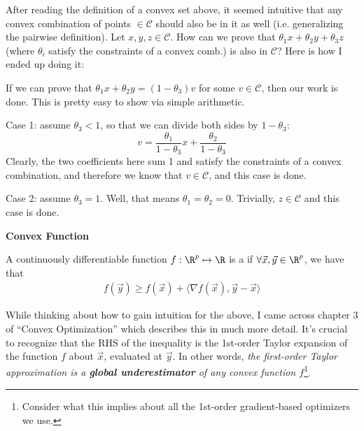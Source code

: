 \documentclass[11pt]{article}
\begin{document}
\begin{example}
	After reading the definition of a convex set above, it seemed intuitive that any convex combination of points $\in \mathcal C$ should also be in it as well (i.e. generalizing the pairwise definition). Let $x, y, z \in \mathcal C$. How can we prove that $\theta_1 x + \theta_2 y + \theta_3 z$ (where $\theta_i$ satisfy the constraints of a convex comb.) is also in $\mathcal C$? Here is how I ended up doing it:
	
	\begin{compactitem}
		\item If we can prove that $\theta_1 x + \theta_2 y = (1 - \theta_3) v$ for some $v \in \mathcal{C}$, then our work is done. This is pretty easy to show via simple arithmetic. 
		\item Case 1: assume $\theta_3 < 1$, so that we can divide both sides by $1 - \theta_3$:
		$$
		v = \frac{\theta_1}{1 - \theta_3} x	+ \frac{\theta_2}{1 - \theta_3}
		$$
		Clearly, the two coefficients here sum 1 and satisfy the constraints of a convex combination, and therefore we know that $v \in \mathcal C$, and this case is done. 
		
		\item Case 2: assume $\theta_3 = 1$. Well, that means $\theta_1 = \theta_2 = 0$. Trivially, $z \in \mathcal C$ and this case is done. 
	\end{compactitem}
\end{example}

\textbf{Convex Function}
\begin{definition}[-1em]
	A continuously differentiable function $f : \R^p \mapsto \R$ is a  if $\forall \vec x, \vec y \in \R^p$, we have that
	\begin{align}
	f(\vec y) \ge f(\vec x) + \langle \nabla f(\vec x), \vec y - \vec x \rangle 
	\end{align}
\end{definition}
While thinking about how to gain intuition for the above, I came across chapter 3 of ``Convex Optimization'' which describes this in much more detail. It's crucial to recognize that the RHS of the inequality is the 1st-order Taylor expansion of the function $f$ about $\vec x$, evaluated at $\vec y$. In other words, \textit{the first-order Taylor approximation is a \textbf{global underestimator} of any convex function $f$}\footnote{Consider what this implies about all the 1st-order gradient-based optimizers we use.}. \\
\end{document}
